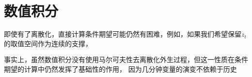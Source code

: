 
\section{数值积分}  \label{sec-numerical-integeration}

即使有了离散化，直接计算条件期望可能仍然有困难，例如，如果我们希望保留$z_t$的取值空间作为连续的支撑，


事实上，虽然数值积分没有使用马尔可夫性去离散化外生过程，但这一性质在条件期望的计算中仍然发挥了基础性的作用，
因为几分钟变量的演变不依赖于历史
